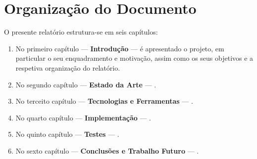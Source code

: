 \section{Organização do Documento}
\label{sec::intro:orgdoc}

O presente relatório estrutura-se em seis capítulos:

\begin{enumerate}
	\item No primeiro capítulo --- \textbf{Introdução} --- é apresentado o projeto, em particular o seu enquadramento e motivação, assim como os seus objetivos e a respetiva organização do relatório.
	
	\item No segundo capítulo --- \textbf{Estado da Arte} --- .
	
	\item No terceito capítulo --- \textbf{Tecnologias e Ferramentas} --- .
	
	\item No quarto capítulo --- \textbf{Implementação} --- .
	
	\item No quinto capítulo --- \textbf{Testes} --- .
	
	\item No sexto capítulo --- \textbf{Conclusões e Trabalho Futuro} --- .
\end{enumerate}
